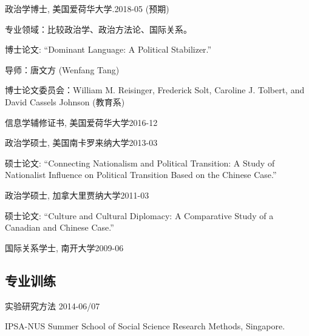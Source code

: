 \documentclass[10.5pt,]{article}
\providecommand{\tightlist}{%
  \setlength{\itemsep}{0pt}\setlength{\parskip}{0pt}}
\renewenvironment{itemize}{
  \begin{list}{}{
    \setlength{\leftmargin}{1.5em}
  }
}{
  \end{list}
}
\begin{document}
\begin{itemize}
\tightlist
\item
  政治学博士, 美国爱荷华大学.\hfill 2018-05 (预期)

  \begin{itemize}
  \tightlist
  \item
    \footnotesize 专业领域：比较政治学、政治方法论、国际关系。
  \item
    \footnotesize 博士论文: ``Dominant Language: A Political
    Stabilizer.''

    \begin{itemize}
    \tightlist
    \item
      导师：唐文方 (Wenfang Tang)
    \item
      博士论文委员会：William M. Reisinger, Frederick Solt, Caroline J.
      Tolbert, and David Cassels Johnson (教育系)
    \end{itemize}
  \end{itemize}
\item
  信息学辅修证书, 美国爱荷华大学\hfill 2016-12
\item
  政治学硕士, 美国南卡罗来纳大学\hfill 2013-03

  \begin{itemize}
  \tightlist
  \item
    \footnotesize 硕士论文: ``Connecting Nationalism and Political
    Transition: A Study of Nationalist Influence on Political Transition
    Based on the Chinese Case.''
  \end{itemize}
\item
  政治学硕士, 加拿大里贾纳大学\hfill 2011-03

  \begin{itemize}
  \tightlist
  \item
    \footnotesize 硕士论文: ``Culture and Cultural Diplomacy: A
    Comparative Study of a Canadian and Chinese Case.''
  \end{itemize}
\item
  国际关系学士, 南开大学\hfill 2009-06
\end{itemize}

\subsection{专业训练}

\begin{itemize}
\tightlist
\item
  实验研究方法 \hfill 2014-06/07

  \begin{itemize}
  \tightlist
  \item
    \footnotesize IPSA-NUS Summer School of Social Science Research
    Methods, Singapore.
  \end{itemize}
\end{itemize}
\end{document}
